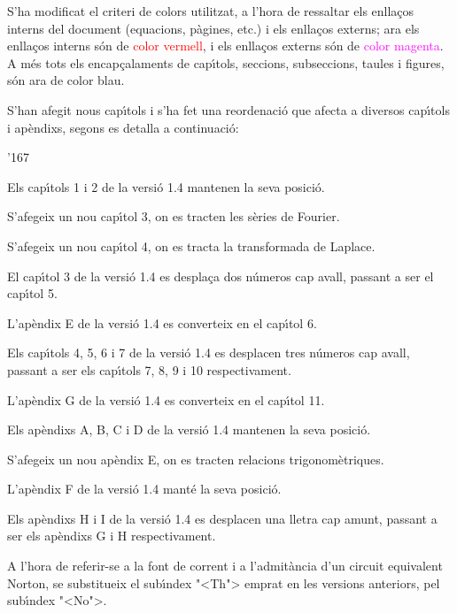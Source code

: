 S'ha modificat el criteri de colors utilitzat, a l'hora de ressaltar
els enlla\c{c}os interns del document (equacions, p\`{a}gines, etc.) i els
enlla\c{c}os externs; ara els enlla\c{c}os interns s\'{o}n de
\textcolor{red}{color vermell}, i els enlla\c{c}os externs s\'{o}n de
\textcolor{magenta}{color magenta}. A m\'{e}s tots els encap\c{c}alaments
de cap\'{\i}tols, seccions,
 subseccions, taules  i figures, s\'{o}n ara de
 \textcolor{NavyBlue}{color blau}.

S'han afegit nous cap\'{\i}tols i s'ha fet una reordenaci\'{o} que afecta a
diversos cap\'{\i}tols i ap\`{e}ndixs, segons es detalla a continuaci\'{o}:
\begin{dinglist}{'167}
   \item Els cap\'{\i}tols 1 i 2  de la versi\'{o} 1.4 mantenen la seva posici\'{o}.
   \item S'afegeix un nou cap\'{\i}tol 3, on es tracten les s\`{e}ries de Fourier.
   \item S'afegeix un nou cap\'{\i}tol 4, on es tracta la transformada de Laplace.
   \item El cap\'{\i}tol 3 de la versi\'{o} 1.4 es despla\c{c}a dos n\'{u}meros cap
    avall, passant a ser el cap\'{\i}tol 5.
   \item L'ap\`{e}ndix E de la versi\'{o} 1.4 es converteix en el cap\'{\i}tol 6.
   \item Els cap\'{\i}tols 4, 5, 6 i 7  de la versi\'{o} 1.4 es desplacen tres n\'{u}meros cap
    avall, passant a ser els cap\'{\i}tols 7, 8, 9 i 10 respectivament.
    \item L'ap\`{e}ndix G de la versi\'{o} 1.4 es converteix en el cap\'{\i}tol 11.
    \item Els ap\`{e}ndixs A, B, C i D de la versi\'{o} 1.4 mantenen la seva posici\'{o}.
    \item S'afegeix un nou ap\`{e}ndix E, on es tracten relacions trigonom\`{e}triques.
    \item L'ap\`{e}ndix F de la versi\'{o} 1.4 mant\'{e} la seva posici\'{o}.
    \item Els ap\`{e}ndixs H i I de la versi\'{o} 1.4 es desplacen una lletra cap
    amunt, passant a ser els ap\`{e}ndixs G i H respectivament.
\end{dinglist}


 A l'hora de referir-se a la font de corrent i a l'admit\`{a}ncia d'un circuit equivalent
 Norton, se substitueix el sub\'{\i}ndex {"<}Th{">} emprat en les versions
anteriors, pel sub\'{\i}ndex {"<}No{">}.

